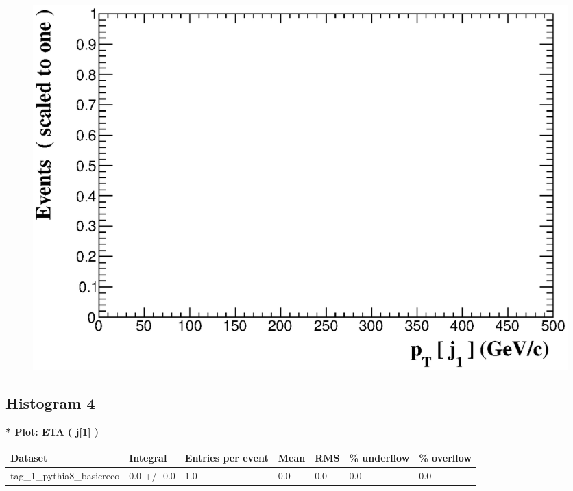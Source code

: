 \documentclass[a4paper, 10pt]{article}
\begin{document}
\begin{figure}[H]
  \begin{center}
    \includegraphics[scale=0.45]{selection_2.eps}\\
\caption{   }
  \end{center}
\end{figure}
      \newpage
\subsection{ Histogram 4}

\textbf{* Plot: ETA ( j[1] ) }\\
   \begin{table}[H]
  \begin{center}
    \begin{tabular}{|m{23.0mm}|m{23.0mm}|m{18.0mm}|m{19.0mm}|m{19.0mm}|m{19.0mm}|m{19.0mm}|}
      \hline
      {\cellcolor{yellow}         Dataset}& {\cellcolor{yellow}         Integral}& {\cellcolor{yellow}         Entries per event}& {\cellcolor{yellow}         Mean}& {\cellcolor{yellow}         RMS}& {\cellcolor{yellow}         \% underflow}& {\cellcolor{yellow}         \% overflow}\\
      \hline
      {\cellcolor{white}         tag\_1\_pythia8\_basicreco}& {\cellcolor{white}         0.0 +/\-- 0.0}& {\cellcolor{white}         1.0}& {\cellcolor{white}         0.0}& {\cellcolor{white}         0.0}& {\cellcolor{green}         0.0}& {\cellcolor{green}         0.0}\\
\hline
    \end{tabular}
  \end{center}
\end{table}
\end{document}
